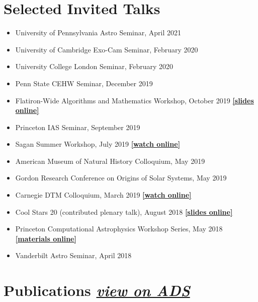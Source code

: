 \documentclass{clean_cv}
\begin{document}
\section{Selected Invited Talks}
\begin{itemize}
    \item University of Pennsylvania Astro Seminar, April 2021
    \item University of Cambridge Exo-Cam Seminar, February 2020
    \item University College London Seminar, February 2020
    \item Penn State CEHW Seminar, December 2019
    \item Flatiron-Wide Algorithms and Mathematics Workshop, October 2019 \textbf{\href{https://docs.google.com/presentation/d/13CaXkgor0SEBYYRkPuTw-HXuIVFmWTemlUkb3QwjX8E/edit?usp=sharing}{[slides online]}}
    \item Princeton IAS Seminar, September 2019
    \item Sagan Summer Workshop, July 2019 \textbf{\href{https://www.youtube.com/watch?v=hCYlOhCI_gI}{[watch online]}}
    \item American Museum of Natural History Colloquium, May 2019
    \item Gordon Research Conference on Origins of Solar Systems, May 2019
    \item Carnegie DTM Colloquium, March 2019 \textbf{\href{https://www.youtube.com/watch?v=imQbRhY76MQ}{[watch online]}}
    \item Cool Stars 20 (contributed plenary talk), August 2018 \textbf{\href{https://coolstars20.github.io/talkpdf/Bedell.pdf}{[slides online]}}
    \item Princeton Computational Astrophysics Workshop Series, May 2018 \textbf{\href{https://github.com/megbedell/astro-dataviz}{[materials online]}}
    \item Vanderbilt Astro Seminar, April 2018
\end{itemize}

\newpage
\section{Publications \hfill \textit{\href{https://ui.adsabs.harvard.edu/public-libraries/azGh82kST26WzcBhHOVhAw}{view on ADS}}}
\end{document}

